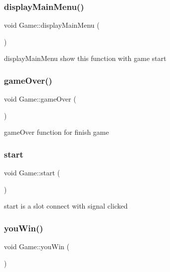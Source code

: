 \subsubsection{\texorpdfstring{display\+Main\+Menu()}{displayMainMenu()}}
{\footnotesize\ttfamily void Game\+::display\+Main\+Menu (\begin{DoxyParamCaption}{ }\end{DoxyParamCaption})}



display\+Main\+Menu show this function with game start 

\hypertarget{class_game_ac7d371f3f30513a4f3c57f521fac9b5f}{}\label{class_game_ac7d371f3f30513a4f3c57f521fac9b5f} 
\subsubsection{\texorpdfstring{game\+Over()}{gameOver()}}
{\footnotesize\ttfamily void Game\+::game\+Over (\begin{DoxyParamCaption}{ }\end{DoxyParamCaption})}



game\+Over function for finish game 

\hypertarget{class_game_a3d9b98f7c4a96ecf578f75b96c9f0e90}{}\label{class_game_a3d9b98f7c4a96ecf578f75b96c9f0e90} 
\subsubsection{\texorpdfstring{start}{start}}
{\footnotesize\ttfamily void Game\+::start (\begin{DoxyParamCaption}{ }\end{DoxyParamCaption})\hspace{0.3cm}{\ttfamily [slot]}}



start is a slot connect with signal clicked 

\hypertarget{class_game_a574eb7e3a432099107f3fb3150d2d6ad}{}\label{class_game_a574eb7e3a432099107f3fb3150d2d6ad} 
\subsubsection{\texorpdfstring{you\+Win()}{youWin()}}
{\footnotesize\ttfamily void Game\+::you\+Win (\begin{DoxyParamCaption}{ }\end{DoxyParamCaption})}



